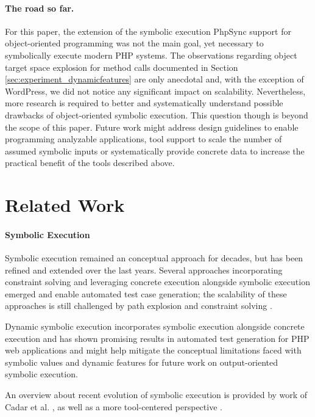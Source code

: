 \documentclass[sigconf]{acmart}
\renewcommand{\sf}[1]{\textsf{#1}}
\begin{document}
\paragraph{The road so far.}
For this paper, the extension of the symbolic execution \sf{PhpSync} \cite{Nguyen:2014:BCG:2635868.2635928}
support for object-oriented programming was not the main goal, yet necessary to
symbolically execute modern PHP systems. The observations regarding object
target space explosion for method calls documented in Section
\ref{sec:experiment_dynamicfeatures} are only anecdotal and, with the exception
of \sf{WordPress}, we did not notice any significant impact on scalability.
Nevertheless, more research is required to better and systematically understand
possible drawbacks of object-oriented symbolic execution. 
This question though is beyond the scope of this paper.
Future work might address design guidelines to enable programming analyzable applications, tool support to scale
the number of assumed symbolic inputs or systematically provide concrete data
to increase the practical benefit of the tools described above.


\section{Related Work} \label{sec:related_work}

\paragraph{Symbolic Execution}
Symbolic execution \cite{King1976,Darringer1978} remained an conceptual approach
for decades, but has been refined and extended over the last years. Several
approaches incorporating constraint solving and leveraging concrete execution
alongside symbolic execution emerged and enable automated test case generation;
the scalability of these approaches is still challenged by path explosion and constraint solving \cite{CadarSen2013}. 

Dynamic symbolic execution \cite{CadarSen2013} incorporates symbolic execution
alongside concrete execution and has shown promising results in automated test
generation\cite{artzi_finding_2008,artzi_finding_2010,DynamicWassermann} for PHP web
applications and might help mitigate the conceptual limitations faced with
symbolic values and dynamic features for future work on output-oriented
symbolic execution.

An overview about recent evolution of symbolic execution is provided by work of Cadar et al.
\cite{CadarSen2013}, as well as a more tool-centered perspective \cite{Cadar2011}.
\end{document}
